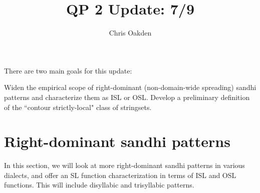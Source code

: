 \documentclass{article}
\title{QP 2 Update: 7/9}
\author{Chris Oakden}
\begin{document}
\maketitle
There are two main goals for this update:
\begin{exe}
\ex
\begin{xlist}
	\ex Widen the empirical scope of right-dominant (non-domain-wide spreading) sandhi patterns and characterize them as ISL or OSL.
	\ex Develop a preliminary definition of the ``contour strictly-local" class of stringsets.
\end{xlist}
\end{exe}
\section{Right-dominant sandhi patterns}
In this section, we will look at more right-dominant sandhi patterns in various dialects, and offer an SL function characterization in terms of ISL and OSL functions. This will include disyllabic and trisyllabic patterns.
\end{document}
